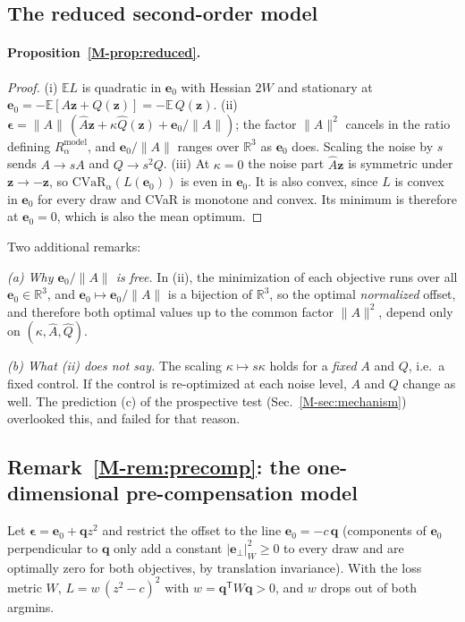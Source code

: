 \documentclass[aps,pra,onecolumn,notitlepage,superscriptaddress,nofootinbib,floatfix]{revtex4-2}
\newcommand{\cvar}{\mathrm{CVaR}}
\newcommand{\E}{\mathbb{E}}
\newcommand{\Rm}{R^{\mathrm{model}}}
\begin{document}
\subsection{The reduced second-order model}

\paragraph*{Proposition~\ref{M-prop:reduced}.}
\begin{proof}
(i) $\E L$ is quadratic in $\mathbf e_0$ with Hessian $2W$ and stationary at
$\mathbf e_0=-\E[A\mathbf z+Q(\mathbf z)]=-\E\,Q(\mathbf z)$.
(ii) $\boldsymbol\epsilon=\|A\|\,(\hat A\mathbf z+\kappa\hat Q(\mathbf z)+\mathbf e_0/\|A\|)$;
the factor $\|A\|^2$ cancels in the ratio defining $\Rm_\alpha$, and
$\mathbf e_0/\|A\|$ ranges over $\mathbb R^3$ as $\mathbf e_0$ does. Scaling
the noise by $s$ sends $A\to sA$ and $Q\to s^2Q$.
(iii) At $\kappa=0$ the noise part $\hat A\mathbf z$ is symmetric under
$\mathbf z\to-\mathbf z$, so $\cvar_\alpha(L(\mathbf e_0))$ is even in
$\mathbf e_0$. It is also convex, since $L$ is convex in $\mathbf e_0$ for
every draw and CVaR is monotone and convex. Its minimum is therefore at
$\mathbf e_0=0$, which is also the mean optimum.
\end{proof}

Two additional remarks:

\emph{(a) Why $\mathbf e_0/\|A\|$ is free.} In (ii), the minimization of
each objective runs over all $\mathbf e_0\in\mathbb R^3$, and
$\mathbf e_0\mapsto\mathbf e_0/\|A\|$ is a bijection of $\mathbb R^3$, so the
optimal \emph{normalized} offset, and therefore both optimal values up to the
common factor $\|A\|^2$, depend only on $(\kappa,\hat A,\hat Q)$.

\emph{(b) What (ii) does not say.} The scaling $\kappa\mapsto s\kappa$ holds
for a \emph{fixed} $A$ and $Q$, i.e.\ a fixed control. If the control is
re-optimized at each noise level, $A$ and $Q$ change as well. The prediction
(c) of the prospective test (Sec.~\ref{M-sec:mechanism}) overlooked this, and
failed for that reason.

\subsection{Remark~\ref{M-rem:precomp}: the one-dimensional pre-compensation model}
\label{sec:proofs-precomp}

Let $\boldsymbol\epsilon=\mathbf e_0+\mathbf qz^2$ and restrict the offset to
the line $\mathbf e_0=-c\,\mathbf q$ (components of $\mathbf e_0$
perpendicular to $\mathbf q$ only add a constant $|\mathbf e_\perp|^2_W\ge0$
to every draw and are optimally zero for both objectives, by translation
invariance). With the loss metric $W$, $L=w\,(z^2-c)^2$ with
$w=\mathbf q^{\mathsf T}W\mathbf q>0$, and $w$ drops out of both argmins.
\end{document}
